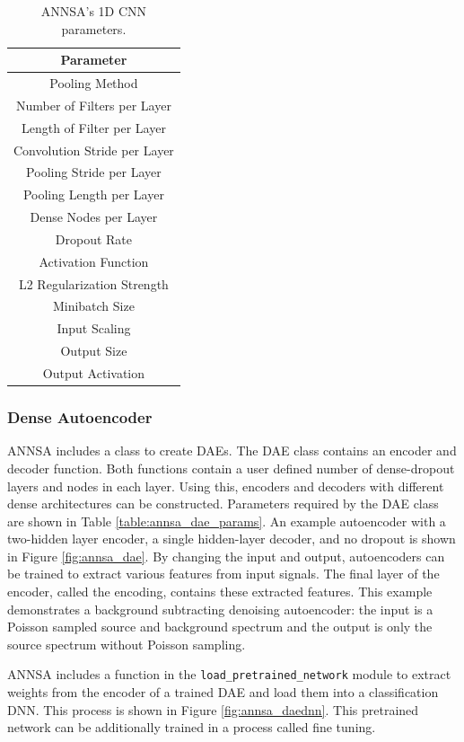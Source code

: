 \begin{table}[H]
\centering
\caption{ANNSA's 1D CNN parameters.}
\begin{tabular}{c}
\hline
Parameter \\ \hline
Pooling Method \\
Number of Filters per Layer \\
Length of Filter per Layer \\
Convolution Stride per Layer \\
Pooling Stride per Layer \\
Pooling Length per Layer \\
Dense Nodes per Layer \\
Dropout Rate \\
Activation Function \\
L2 Regularization Strength \\ 
Minibatch Size \\ 
Input Scaling \\
Output Size \\
Output Activation \\ \hline
\end{tabular}
\label{table:annsa_cnn_params}
\end{table}

\subsubsection{Dense Autoencoder}

ANNSA includes a class to create DAEs. The DAE class contains an encoder and decoder function. Both functions contain a user defined number of dense-dropout layers and nodes in each layer. Using this, encoders and decoders with different dense architectures can be constructed. Parameters required by the DAE class are shown in Table \ref{table:annsa_dae_params}. An example autoencoder with a two-hidden layer encoder, a single hidden-layer decoder, and no dropout is shown in Figure \ref{fig:annsa_dae}. By changing the input and output, autoencoders can be trained to extract various features from input signals. The final layer of the encoder, called the encoding, contains these extracted features. This example demonstrates a background subtracting denoising autoencoder: the input is a Poisson sampled source and background spectrum and the output is only the source spectrum without Poisson sampling.

ANNSA includes a function in the \verb|load_pretrained_network| module to extract weights from the encoder of a trained DAE and load them into a classification DNN. This process is shown in Figure \ref{fig:annsa_daednn}. This pretrained network can be additionally trained in a process called fine tuning.

